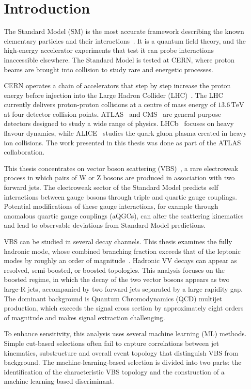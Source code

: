 \chapter*{Introduction}
The Standard Model (SM) is the most accurate framework describing the known elementary particles and their interactions~\cite{Thomson_ModernParticlePhysics_2013, Griffiths_IntroParticles_2008, ParticleDataGroup:2024cfk}. It is a quantum field theory, and the high-energy accelerator experiments that test it can probe interactions inaccessible elsewhere. The Standard Model is tested at CERN, where proton beams are brought into collision to study rare and energetic processes.

CERN operates a chain of accelerators that step by step increase the proton energy before injection into the Large Hadron Collider (LHC)~\cite{Evans:2008zzb}. The LHC currently delivers proton-proton collisions at a centre of mass energy of $13.6\,\mathrm{TeV}$ at four detector collision points. ATLAS~\cite{Aad:2008zzm} and CMS~\cite{CMS:2008zzk} are general purpose detectors designed to study a wide range of physics. LHCb~\cite{LHCb:2008vvz} focuses on heavy flavour dynamics, while ALICE~\cite{ALICE:2008ngc} studies the quark gluon plasma created in heavy ion collisions. The work presented in this thesis was done as part of the ATLAS collaboration.

This thesis concentrates on vector boson scattering (VBS)~\cite{ATLAS:ssWWobs:2019}, a rare electroweak process in which pairs of W or Z bosons are produced in association with two forward jets. The electroweak sector of the Standard Model predicts self interactions between gauge bosons through triple and quartic gauge couplings. Potential modifications of these gauge interactions, for example through anomalous quartic gauge couplings (aQGCs), can alter the scattering kinematics and lead to observable deviations from Standard Model predictions.

VBS can be studied in several decay channels. This thesis examines the fully hadronic mode, whose combined branching fraction exceeds that of the leptonic modes by roughly an order of magnitude~\cite{ParticleDataGroup:2024cfk}. Hadronic VV decays can appear as resolved, semi-boosted, or boosted topologies. This analysis focuses on the boosted regime, in which the decay of the two vector bosons appears as two large-R jets, accompanied by two forward jets separated by a large rapidity gap. The dominant background is Quantum Chromodynamics (QCD) multijet production, which exceeds the signal cross section by approximately eight orders of magnitude and makes signal extraction challenging.

To enhance sensitivity, this analysis uses several machine learning (ML) methods. Simple cut-based selections often fail to capture correlations between jet kinematics, substructure and overall event topology that distinguish VBS from background. The machine-learning-based selection is divided into two parts: the identification of the characteristic VBS topology and the construction of a machine-learning-based discriminant.
